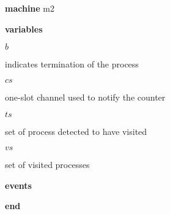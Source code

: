 \begin{block}
  \item   \textbf{machine} m2
  \item   \textbf{variables}
  \begin{block}
    \item   $b$
    \item   \begin{block}
      \item    indicates termination of the process 
    \end{block}
    \item   $cs$
    \item   \begin{block}
      \item   one-slot channel used to notify the counter 
    \end{block}
    \item   $ts$
    \item   \begin{block}
      \item   set of process detected to have visited
    \end{block}
    \item   $vs$
    \item   \begin{block}
      \item   set of visited processes
    \end{block}
  \end{block}
  \item   
  \item   
  \item   
  \item   \textbf{events}
  \begin{block}
    \item   
    \item   
    \item   
    \item   
  \end{block}
  \item   \textbf{end} \\
\end{block}
